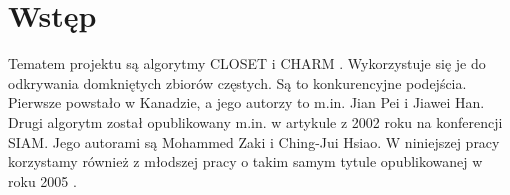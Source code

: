 \section{Wstęp}

Tematem projektu są algorytmy CLOSET \cite{closetArt} i CHARM \cite{charmArt}. Wykorzystuje się je do odkrywania domkniętych zbiorów częstych.
Są to konkurencyjne podejścia. Pierwsze powstało w Kanadzie, a jego autorzy to m.in. Jian Pei i Jiawei Han. Drugi algorytm został opublikowany m.in. w artykule z 2002 roku na konferencji SIAM. Jego autorami są Mohammed Zaki i Ching-Jui Hsiao. W niniejszej pracy korzystamy również z młodszej pracy o takim samym tytule opublikowanej w roku 2005 \cite{charmArt}.

